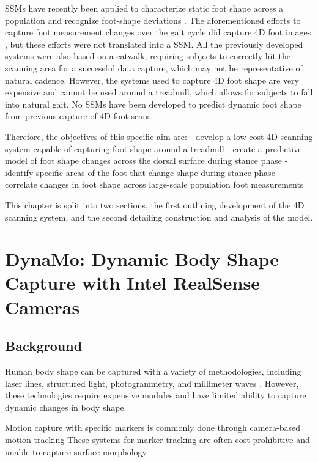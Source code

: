 \documentclass[defaultstyle,11pt]{comps}
\begin{document}
SSMs have recently been applied to characterize static foot shape across a population \citep{Conrad2019} and recognize foot-shape deviations \citep{Stankovic2020}.
The aforementioned efforts to capture foot measurement changes over the gait cycle did capture 4D foot images \citep{Barisch-Fritz2014, Grau2018}, but these efforts were not translated into a SSM.
All the previously developed systems were also based on a catwalk, requiring subjects to correctly hit the scanning area for a successful data capture, which may not be representative of natural cadence. However, the systems used to capture 4D foot shape are very expensive and cannot be used around a treadmill, which allows for subjects to fall into natural gait. No SSMs have been developed to predict dynamic foot shape from previous capture of 4D foot scans.

Therefore, the objectives of this specific aim are:
- develop a low-cost 4D scanning system capable of capturing foot shape around a treadmill
- create a predictive model of foot shape changes across the dorsal surface during stance phase
- identify specific areas of the foot that change shape during stance phase
- correlate changes in foot shape across large-scale population foot measurements

This chapter is split into two sections, the first outlining development of the 4D scanning system, and the second detailing construction and analysis of the model.

\hypertarget{dynamo-dynamic-body-shape-capture-with-intel-realsense-cameras}{%
\section{DynaMo: Dynamic Body Shape Capture with Intel RealSense Cameras}\label{dynamo-dynamic-body-shape-capture-with-intel-realsense-cameras}}

\hypertarget{background-1}{%
\subsection{Background}\label{background-1}}

Human body shape can be captured with a variety of methodologies, including laser lines, structured light, photogrammetry, and millimeter waves \citep{Daanen:2013}.
However, these technologies require expensive modules and have limited ability to capture dynamic changes in body shape.

Motion capture with specific markers is commonly done through camera-based motion tracking \citep{Windolf:2008}
These systems for marker tracking are often cost prohibitive and unable to capture surface morphology.
\end{document}

